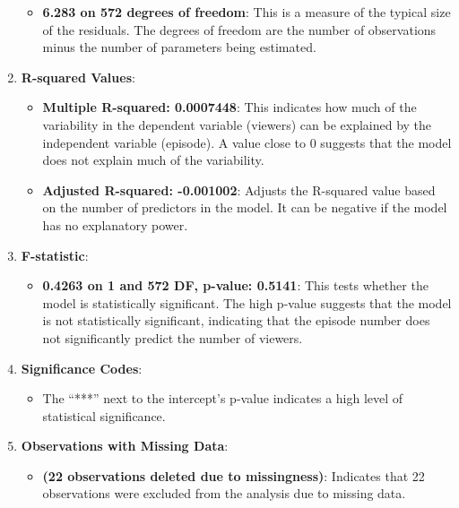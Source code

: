 \documentclass[
]{book}
\providecommand{\tightlist}{%
  \setlength{\itemsep}{0pt}\setlength{\parskip}{0pt}}
\begin{document}
\begin{enumerate}
  \begin{itemize}
  \tightlist
  \item
    \textbf{6.283 on 572 degrees of freedom}: This is a measure of the typical size of the residuals. The degrees of freedom are the number of observations minus the number of parameters being estimated.
  \end{itemize}
\item
  \textbf{R-squared Values}:

  \begin{itemize}
  \tightlist
  \item
    \textbf{Multiple R-squared: 0.0007448}: This indicates how much of the variability in the dependent variable (viewers) can be explained by the independent variable (episode). A value close to 0 suggests that the model does not explain much of the variability.
  \item
    \textbf{Adjusted R-squared: -0.001002}: Adjusts the R-squared value based on the number of predictors in the model. It can be negative if the model has no explanatory power.
  \end{itemize}
\item
  \textbf{F-statistic}:

  \begin{itemize}
  \tightlist
  \item
    \textbf{0.4263 on 1 and 572 DF, p-value: 0.5141}: This tests whether the model is statistically significant. The high p-value suggests that the model is not statistically significant, indicating that the episode number does not significantly predict the number of viewers.
  \end{itemize}
\item
  \textbf{Significance Codes}:

  \begin{itemize}
  \tightlist
  \item
    The ``***'' next to the intercept's p-value indicates a high level of statistical significance.
  \end{itemize}
\item
  \textbf{Observations with Missing Data}:

  \begin{itemize}
  \tightlist
  \item
    \textbf{(22 observations deleted due to missingness)}: Indicates that 22 observations were excluded from the analysis due to missing data.
  \end{itemize}
\end{enumerate}
\end{document}
